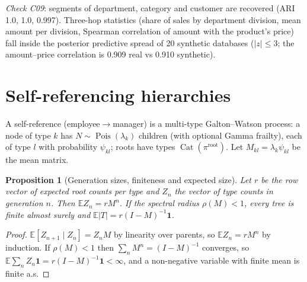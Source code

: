 \documentclass[11pt,a4paper]{article}
\newtheorem{proposition}{Proposition}
\theoremstyle{definition}
\theoremstyle{remark}
\newcommand{\E}{\mathbb{E}}
\newcommand{\Pois}{\operatorname{Pois}}
\newcommand{\Cat}{\operatorname{Cat}}
\begin{document}
\noindent\emph{Check C09}: segments of department, category and customer are recovered (ARI 1.0, 1.0, 0.997). Three-hop statistics (share of sales by department division, mean amount per division, Spearman correlation of amount with the product's price) fall inside the posterior predictive spread of 20 synthetic databases ($|z|\le3$; the amount--price correlation is 0.909 real vs 0.910 synthetic).

\section{Self-referencing hierarchies}\label{sec:tree}
A self-reference (employee$\to$manager) is a multi-type Galton--Watson process: a node of type $k$ has $N\sim\Pois(\lambda_k)$ children (with optional Gamma frailty), each of type $l$ with probability $\psi_{kl}$; roots have types $\Cat(\pi^{\mathrm{root}})$. Let $M_{kl}=\lambda_k\psi_{kl}$ be the mean matrix.

\begin{proposition}[Generation sizes, finiteness and expected size]\label{prop:gw}
Let $r$ be the row vector of expected root counts per type and $Z_n$ the vector of type counts in generation $n$. Then $\E Z_n=rM^n$. If the spectral radius $\rho(M)<1$, every tree is finite almost surely and $\E|T|=r(I-M)^{-1}\mathbf 1$.
\end{proposition}
\begin{proof}
$\E[Z_{n+1}\mid Z_n]=Z_nM$ by linearity over parents, so $\E Z_n=rM^n$ by induction. If $\rho(M)<1$ then $\sum_nM^n=(I-M)^{-1}$ converges, so $\E\sum_n Z_n\mathbf 1=r(I-M)^{-1}\mathbf 1<\infty$, and a non-negative variable with finite mean is finite a.s.
\end{proof}
\end{document}
